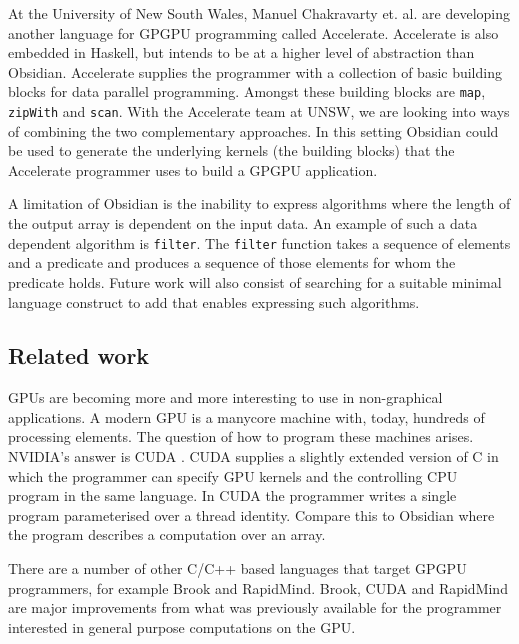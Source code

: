 At the University of New South Wales, Manuel Chakravarty 
et. al. are developing another language for GPGPU programming
called Accelerate. Accelerate is also embedded in Haskell, but intends
to be at a higher 
level of abstraction than Obsidian. Accelerate supplies the programmer 
with a collection of basic building blocks for data parallel programming. 
Amongst these building blocks are {\tt map}, {\tt zipWith} and {\tt scan}.
With the Accelerate team at UNSW, we are looking into 
ways of combining the two complementary approaches. In this setting Obsidian 
could be used to generate the underlying kernels (the building blocks) that the Accelerate 
programmer uses to build a GPGPU application. 

A limitation of Obsidian is the inability to express algorithms where 
the length of the output array is dependent on the input data. 
An example of such a data dependent algorithm is {\tt filter}. The {\tt filter} 
function takes a sequence of elements and a predicate and produces a sequence 
of those elements for whom the predicate holds. Future work 
will also consist of searching for a suitable minimal language construct
to add that enables expressing such algorithms. 






\subsection{Related work}

GPUs are becoming more and more interesting to use in non-graphical applications.
A modern GPU is a manycore machine with, today, hundreds of processing elements. 
The question of how to program these machines arises. NVIDIA's answer is CUDA
\cite{CUDAGuide2.0}. CUDA supplies a slightly extended version of C in which 
the programmer can specify GPU kernels and the controlling CPU program in the 
same language. In CUDA the programmer writes a single program parameterised 
over a thread identity. Compare this to Obsidian where the program describes 
a computation over an array. 

There are a number of other C/C++ based languages that target 
GPGPU programmers, for example Brook\cite{Brook} and 
RapidMind\cite{RapidMind}. Brook, CUDA and RapidMind are major improvements from 
what was previously available for the programmer interested in general purpose 
computations on the GPU. 

